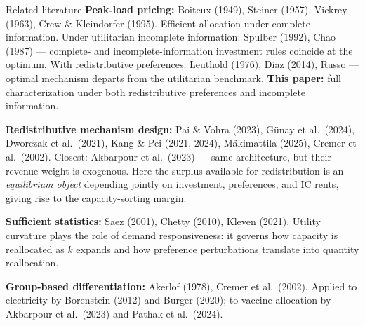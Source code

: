 \documentclass[10pt, aspectratio=169]{beamer}
\begin{document}
\begin{frame}{Related literature}
\textbf{Peak-load pricing:} Boiteux (1949), Steiner (1957), Vickrey (1963), Crew \& Kleindorfer (1995). Efficient allocation under complete information. Under utilitarian incomplete information: Spulber (1992), Chao (1987) — complete- and incomplete-information investment rules coincide at the optimum. With redistributive preferences: Leuthold (1976), Diaz (2014), Russo — optimal mechanism departs from the utilitarian benchmark. \textbf{This paper:} full characterization under both redistributive preferences and incomplete information.
\vspace{0.2cm}

\textbf{Redistributive mechanism design:} Pai \& Vohra (2023), G\"unay et al.\ (2024), Dworczak et al.\ (2021), Kang \& Pei (2021, 2024), M\"akimattila (2025), Cremer et al.\ (2002). Closest: Akbarpour et al.\ (2023) — same architecture, but their revenue weight is exogenous. Here the surplus available for redistribution is an \emph{equilibrium object} depending jointly on investment, preferences, and IC rents, giving rise to the capacity-sorting margin.
\vspace{0.2cm}

\textbf{Sufficient statistics:} Saez (2001), Chetty (2010), Kleven (2021). Utility curvature plays the role of demand responsiveness: it governs how capacity is reallocated as $k$ expands and how preference perturbations translate into quantity reallocation.
\vspace{0.2cm}

\textbf{Group-based differentiation:} Akerlof (1978), Cremer et al.\ (2002). Applied to electricity by Borenstein (2012) and Burger (2020); to vaccine allocation by Akbarpour et al.\ (2023) and Pathak et al.\ (2024).
\end{frame}
\end{document}
